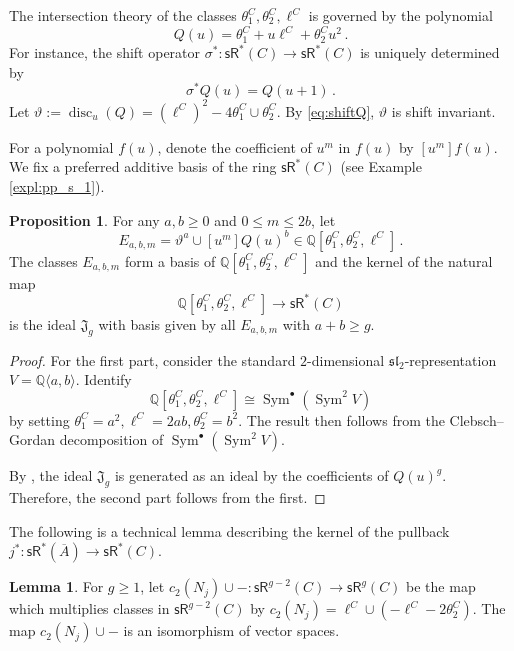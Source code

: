 \documentclass[11pt]{article}
\def\QQ{\mathbb{Q}}
\def\sR{\mathsf{sR}}
\newcommand{\barA}{\overline{A}}
\newcommand{\sh}{\sigma}
\theoremstyle{definition}
\newtheorem{proposition}[definition]{Proposition}
\newtheorem{lemma}[definition]{Lemma}
\begin{document}
The intersection theory of the classes $\theta_1^C, \theta_2^C, \ell^C$ is governed by the polynomial
\begin{equation}\label{eq:Q}
    Q(u) = \theta_1^C + u\ell^C + \theta_2^C u^2\, .
\end{equation}
For instance, the shift operator $\sh^* : \sR^*(C) \to \sR^*(C)$ is uniquely determined by
\begin{equation}\label{eq:shiftQ}
\sh^*Q(u) = Q(u+1)\, .
\end{equation}
Let $\vartheta := \operatorname{disc}_u(Q) = (\ell^C)^2 - 4\theta_1^C \cup \theta_2^C$. By \eqref{eq:shiftQ}, $\vartheta$ is shift invariant.

For a polynomial $f(u)$, denote the coefficient of $u^m$ in $f(u)$ by
$[u^m]f(u)$. We fix a preferred additive basis of the ring $\sR^*(C)$ (see
Example \ref{expl:pp_s_1}).

\begin{proposition}\label{pro:basis}
    For any $a,b \geq 0$ and $0 \leq m \leq 2b$, let
    $$
    E_{a,b,m} = \vartheta^a\cup[u^m]Q(u)^b \in \mathbb Q[\theta_1^C, \theta_2^C, \ell^C]\,.
    $$
    The classes $E_{a,b,m}$ form a basis of $\mathbb Q[\theta_1^C, \theta_2^C, \ell^C]$ and the kernel of the natural map
    $$
    \mathbb Q[\theta_1^C, \theta_2^C, \ell^C] \to \sR^*(C)
    $$
    is the ideal $\mathfrak J_g$ with basis given by all $E_{a,b,m}$ with $a+b \geq g$.
\end{proposition}

\begin{proof}
    For the first part, consider the standard $2$-dimensional $\mathfrak{sl}_2$-representation
    $V=\QQ\langle a,b\rangle$. Identify
    \[
    \QQ[\theta_1^C,\theta_2^C,\ell^C]
    \cong
    \operatorname{Sym}^\bullet(\operatorname{Sym}^2 V)
    \]
	by setting $\theta_1^C = a^2, \ell^C = 2ab, \theta_2^C = b^2$. The result then follows from the Clebsch--Gordan decomposition of
    $\operatorname{Sym}^\bullet(\operatorname{Sym}^2 V)$.

    By \cite[Theorem 3.1]{GZ}, the ideal $\mathfrak J_g$ is generated as an ideal by the coefficients of $Q(u)^g$. Therefore, the second part follows from the first.
\end{proof}

The following is a technical lemma describing the kernel of the pullback $j^* : \sR^*(\barA) \to \sR^*(C)$.

\begin{lemma}\label{lem:einvert}
    For $g\ge 1$, let $c_2(N_j)\cup -: \sR^{g-2}(C) \to \sR^{g}(C)$ be the map which multiplies classes in $\sR^{g-2}(C)$ by $c_2(N_j) = \ell^C\cup(-\ell^C-2\theta_2^C)$. The map $c_2(N_j)\cup -$ is an isomorphism of vector spaces.
\end{lemma}
\end{document}
